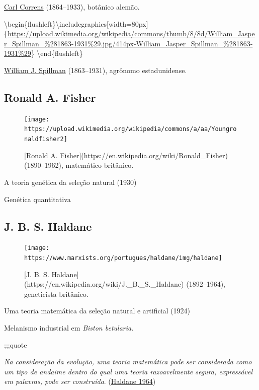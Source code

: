 \documentclass[
]{book}
\begin{document}
\href{https://en.wikipedia.org/wiki/Carl_Correns}{Carl Correns} (1864--1933), botânico alemão.

\textbackslash begin\{flushleft\}\textbackslash includegraphics{[}width=80px{]}\{\url{https://upload.wikimedia.org/wikipedia/commons/thumb/8/8d/William_Jasper_Spillman_\%281863-1931\%29.jpg/414px-William_Jasper_Spillman_\%281863-1931\%29}\} \textbackslash end\{flushleft\}

\href{https://en.wikipedia.org/wiki/William_Jasper_Spillman}{William J. Spillman} (1863--1931), agrônomo estadunidense.

\hypertarget{ronald-a.-fisher}{%
\subsection{Ronald A. Fisher}\label{ronald-a.-fisher}}

\begin{figure}

\hfill{}\texttt{[image: https://upload.wikimedia.org/wikipedia/commons/a/aa/Youngronaldfisher2]} 

\caption{[Ronald A. Fisher](https://en.wikipedia.org/wiki/Ronald_Fisher) (1890--1962), matemático britânico.}\label{fig:fischer}
\end{figure}

A teoria genética da seleção natural (1930)

Genética quantitativa

\hypertarget{j.-b.-s.-haldane}{%
\subsection{J. B. S. Haldane}\label{j.-b.-s.-haldane}}

\begin{figure}

\hfill{}\texttt{[image: https://www.marxists.org/portugues/haldane/img/haldane]} 

\caption{[J. B. S. Haldane](https://en.wikipedia.org/wiki/J._B._S._Haldane) (1892--1964), geneticista britânico.}\label{fig:haldane}
\end{figure}

Uma teoria matemática da seleção natural e artificial (1924)

Melanismo industrial em \emph{Biston betularia}.

;;;quote

\emph{Na consideração da evolução, uma teoria matemática pode ser considerada como um tipo de andaime dentro do qual uma teoria razoavelmente segura, expressável em palavras, pode ser construída}. (\href{https://doi.org/10.1093/ije/dyn056}{Haldane 1964})
\end{document}
